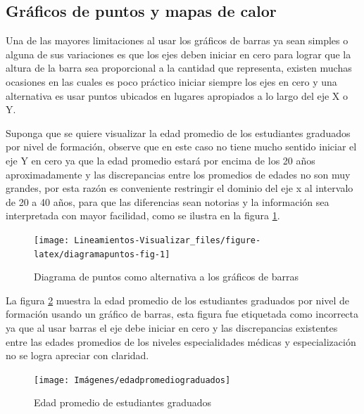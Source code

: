 \documentclass[
]{book}
\begin{document}
\hypertarget{gruxe1ficos-de-puntos-y-mapas-de-calor}{%
\subsection{Gráficos de puntos y mapas de calor}\label{gruxe1ficos-de-puntos-y-mapas-de-calor}}

Una de las mayores limitaciones al usar los gráficos de barras ya sean simples o alguna de sus variaciones es que los ejes deben iniciar en cero para lograr que la altura de la barra sea proporcional a la cantidad que representa, existen muchas ocasiones en las cuales es poco práctico iniciar siempre los ejes en cero y una alternativa es usar puntos ubicados en lugares apropiados a lo largo del eje X o Y.

Suponga que se quiere visualizar la edad promedio de los estudiantes graduados por nivel de formación, observe que en este caso no tiene mucho sentido iniciar el eje Y en cero ya que la edad promedio estará por encima de los 20 años aproximadamente y las discrepancias entre los promedios de edades no son muy grandes, por esta razón es conveniente restringir el dominio del eje x al intervalo de 20 a 40 años, para que las diferencias sean notorias y la información sea interpretada con mayor facilidad, como se ilustra en la figura \ref{fig:diagramapuntos-fig}.

\begin{figure}

{\centering \texttt{[image: Lineamientos-Visualizar\_files/figure-latex/diagramapuntos-fig-1]} 

}

\caption{Diagrama de puntos como alternativa a los gráficos de barras}\label{fig:diagramapuntos-fig}
\end{figure}

La figura \ref{fig:barrasedadpromedio-fig} muestra la edad promedio de los estudiantes graduados por nivel de formación usando un gráfico de barras, esta figura fue etiquetada como incorrecta ya que al usar barras el eje debe iniciar en cero y las discrepancias existentes entre las edades promedios de los niveles especialidades médicas y especialización no se logra apreciar con claridad.

\begin{figure}

{\centering \texttt{[image: Imágenes/edadpromediograduados]} 

}

\caption{Edad promedio de estudiantes graduados}\label{fig:barrasedadpromedio-fig}
\end{figure}
\end{document}
